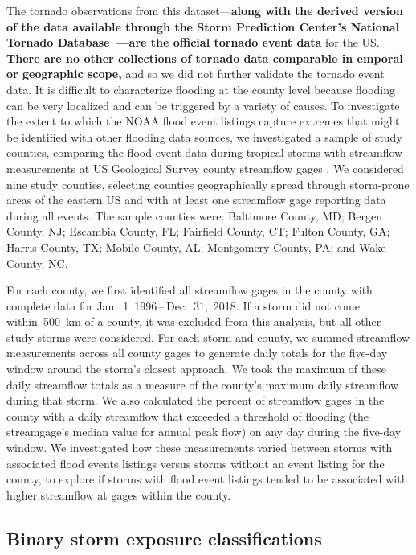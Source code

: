The tornado observations from this dataset---\textbf{along with the derived
version of the data available through the Storm Prediction Center's National
Tornado Database~\parencite{center2020storm}---are the official tornado event
data} for the \ac{US}. \textbf{There are no other collections of tornado data
comparable in emporal or geographic scope,} and so we did not further validate
the tornado event data. It is difficult to characterize flooding at the county
level because flooding can be very localized and can be triggered by a variety
of causes. To investigate the extent to which the NOAA flood event listings
capture extremes that might be identified with other flooding data sources, we
investigated a sample of study counties, comparing the flood event data during
tropical storms with streamflow measurements at \ac{US} Geological Survey
county streamflow gages \parencite{usgsgages, countyfloods, dataRetrieval}.  We
considered nine study counties, selecting counties geographically spread
through storm-prone areas of the eastern \ac{US} and with at least one
streamflow gage reporting data during all events. The sample counties were:
Baltimore County, MD; Bergen County, NJ; Escambia County, FL; Fairfield County,
CT; Fulton County, GA; Harris County, TX; Mobile County, AL; Montgomery County,
PA; and Wake County, NC. 

For each county, we first identified all streamflow gages in the county with
complete data for Jan.~1~1996\,--\,Dec.~31,~2018. If a storm did not come
within~500~\si{\kilo\metre} of a county, it was excluded from this analysis,
but all other study storms were considered.  For each storm and county, we
summed streamflow measurements across all county gages to generate daily totals
for the five-day window around the storm's closest approach. We took the
maximum of these daily streamflow totals as a measure of the county's maximum
daily streamflow during that storm. We also calculated the percent of
streamflow gages in the county with a daily streamflow that exceeded a
threshold of flooding (the streamgage's median value for annual peak flow) on
any day during the five-day window. We investigated how these measurements
varied between storms with associated flood events listings versus storms
without an event listing for the county, to explore if storms with flood event
listings tended to be associated with higher streamflow at gages within the
county.

\subsection*{Binary storm exposure classifications}

